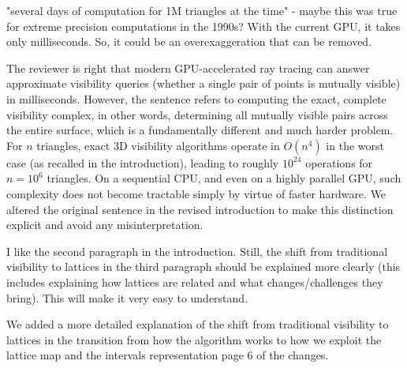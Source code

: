 \documentclass[10pt,french]{letter}
\begin{document}
  \begin{remark}
    "several days of computation for 1M triangles at the time" - maybe this was
    true for extreme precision computations in the 1990s? With the current GPU, it
    takes only milliseconds. So, it could be an overexaggeration that can be
    removed.
  \end{remark}
  \begin{response}
    The reviewer is right that modern GPU-accelerated ray tracing can answer approximate
    visibility queries (whether a single pair of points is mutually visible) in
    milliseconds. However, the sentence refers to computing the exact, complete visibility
    complex, in other words, determining all mutually visible pairs across the entire surface, which is a
    fundamentally different and much harder problem. For $n$ triangles, exact 3D visibility
    algorithms operate in $O(n^4)$ in the worst case (as recalled in the introduction), leading to
    roughly $10^{24}$ operations for $n = 10^6$ triangles. On a sequential CPU, and even on a
    highly parallel GPU, such complexity does not become tractable simply by virtue of faster
    hardware. We altered the original sentence in the revised introduction to make this distinction
    explicit and avoid any misinterpretation.
  \end{response}

  \begin{remark}
    I like the second paragraph in the introduction. Still, the shift from
    traditional visibility to lattices in the third paragraph should be explained
    more clearly (this includes explaining how lattices are related and what
    changes/challenges they bring). This will make it very easy to understand.
  \end{remark}
  \begin{response}
    We added a more detailed explanation of the shift from traditional visibility
    to lattices in the transition from how the algorithm works to how we exploit
    the lattice map and the intervals representation page 6 of the changes.
  \end{response}
\end{document}
